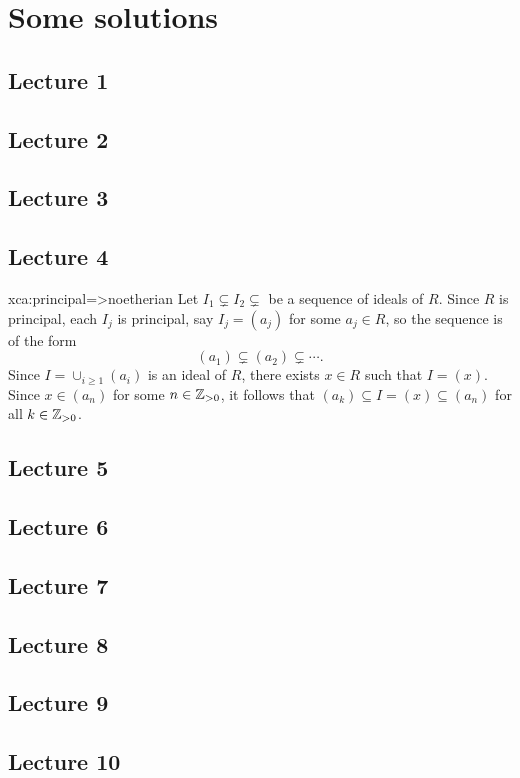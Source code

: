 \chapter{Some solutions}

\section*{Lecture 1}
\section*{Lecture 2}
\section*{Lecture 3}
\section*{Lecture 4}

\begin{sol}{xca:principal=>noetherian}
	Let $I_1\subsetneq I_2\subsetneq$ be a sequence of ideals of $R$.  
	Since $R$ is principal, each $I_j$ is principal, 
	say $I_j=(a_j)$ for some $a_j\in R$, so the sequence is of the form
	\[
	(a_1)\subsetneq (a_2)\subsetneq\cdots.
	\]
	Since $I=\cup_{i\geq1}(a_i)$ is an ideal of $R$, 
	there exists $x\in R$ such that $I=(x)$. Since $x\in (a_n)$ for some $n\in\mathbb{Z}_{>0}$, 
	it follows that $(a_k)\subseteq I=(x)\subseteq (a_n)$ for all $k\in\mathbb{Z}_{>0}$. 
\end{sol}
	
\section*{Lecture 5}
\section*{Lecture 6}
\section*{Lecture 7}
\section*{Lecture 8}
\section*{Lecture 9}
\section*{Lecture 10}

